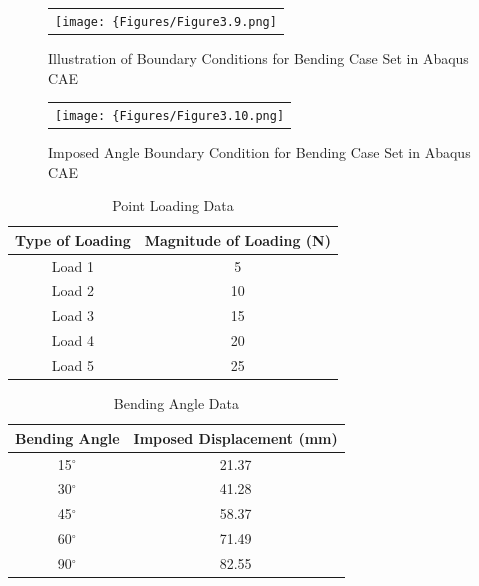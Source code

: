 \documentclass[a4paper,12pt]{article}
\numberwithin{equation}{section}
\numberwithin{figure}{section}
\begin{document}
\begin{figure}[H]
  \centering
  \begin{tabular}{@{}c@{}}
    \texttt{[image: \{Figures/Figure3.9.png]}} \\
  \end{tabular}
  \caption {Illustration of Boundary Conditions for Bending Case Set in Abaqus CAE}
\end{figure}

\begin{figure}[H]
  \centering
  \begin{tabular}{@{}c@{}}
    \texttt{[image: \{Figures/Figure3.10.png]}} \\
  \end{tabular}
  \caption {Imposed Angle Boundary Condition for Bending Case Set in Abaqus CAE}
\end{figure}

\FloatBarrier
\begin{table}[hbt!]
\centering
\caption{Point Loading Data}
\begin{tabular}{|c|c|}
\hline
\textbf{Type of Loading} & \textbf{Magnitude of Loading (N)} \\ \hline
Load 1                   & 5                                 \\ \hline
Load 2                   & 10                                \\ \hline
Load 3                   & 15                                \\ \hline
Load 4                   & 20                                \\ \hline
Load 5                   & 25                                \\ \hline
\end{tabular}
\end{table}

\begin{table}[hbt!]
\centering
\caption{Bending Angle Data}
\begin{tabular}{|c|c|}
\hline
\textbf{Bending Angle} & \textbf{Imposed Displacement (mm)} \\ \hline
15$^{\circ}$           & 21.37                              \\ \hline
30$^{\circ}$           & 41.28                              \\ \hline
45$^{\circ}$           & 58.37                              \\ \hline
60$^{\circ}$           & 71.49                              \\ \hline
90$^{\circ}$           & 82.55                              \\ \hline
\end{tabular}
\end{table}
\FloatBarrier
\end{document}
